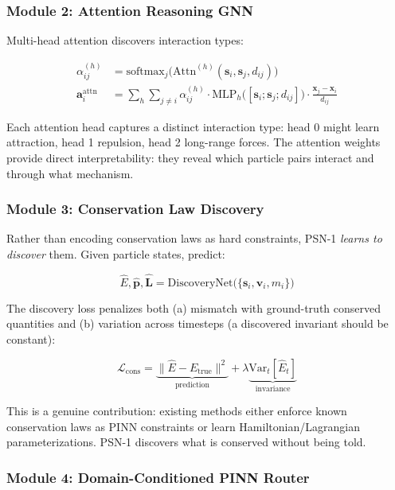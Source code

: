 \documentclass[11pt,a4paper]{article}
\begin{document}
\subsubsection{Module 2: Attention Reasoning GNN}

Multi-head attention discovers interaction types:

\begin{align}
    \alpha_{ij}^{(h)} &= \text{softmax}_j\big(\text{Attn}^{(h)}(\mathbf{s}_i, \mathbf{s}_j, d_{ij})\big) \\
    \mathbf{a}_i^{\text{attn}} &= \sum_h \sum_{j \neq i} \alpha_{ij}^{(h)} \cdot \text{MLP}_h\big([\mathbf{s}_i; \mathbf{s}_j; d_{ij}]\big) \cdot \frac{\mathbf{x}_j - \mathbf{x}_i}{d_{ij}}
\end{align}

Each attention head captures a distinct interaction type: head 0 might learn attraction, head 1 repulsion, head 2 long-range forces. The attention weights provide direct interpretability: they reveal which particle pairs interact and through what mechanism.

\subsubsection{Module 3: Conservation Law Discovery}

Rather than encoding conservation laws as hard constraints, PSN-1 \emph{learns to discover} them. Given particle states, predict:

\begin{equation}
    \hat{E}, \hat{\mathbf{p}}, \hat{\mathbf{L}} = \text{DiscoveryNet}\big(\{\mathbf{s}_i, \mathbf{v}_i, m_i\}\big)
\end{equation}

The discovery loss penalizes both (a) mismatch with ground-truth conserved quantities and (b) variation across timesteps (a discovered invariant should be constant):

\begin{equation}
    \mathcal{L}_{\text{cons}} = \underbrace{\|\hat{E} - E_{\text{true}}\|^2}_{\text{prediction}} + \lambda \underbrace{\text{Var}_t[\hat{E}_t]}_{\text{invariance}}
\end{equation}

This is a genuine contribution: existing methods either enforce known conservation laws as PINN constraints or learn Hamiltonian/Lagrangian parameterizations. PSN-1 discovers what is conserved without being told.

\subsubsection{Module 4: Domain-Conditioned PINN Router}
\end{document}
